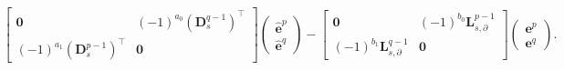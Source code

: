 \documentclass{elsarticle}
\newcommand*{\dual}[1]{\ensuremath{\widehat{#1}}}
\begin{document}
\begin{equation}
\begin{aligned}
\begin{bmatrix}
        \mathbf{0} & (-1)^{a_0}(\mathbf{D}_s^{q-1})^\top\\
        (-1)^{a_1}(\mathbf{D}_s^{p-1})^\top & \mathbf{0}
    \end{bmatrix}
    \begin{pmatrix}
    \dual{\mathbf{e}}^p \\
    \dual{\mathbf{e}}^q
    \end{pmatrix} -
    \begin{bmatrix}
        \mathbf{0} & (-1)^{b_0}\mathbf{L}_{s, \partial}^{p-1} \\
        (-1)^{b_1}\mathbf{L}^{q-1}_{s, \partial} & \mathbf{0}
    \end{bmatrix}
    \begin{pmatrix}
    {\mathbf{e}}^p \\
    {\mathbf{e}}^q
    \end{pmatrix}.
\end{aligned}
\end{equation}
\end{document}
